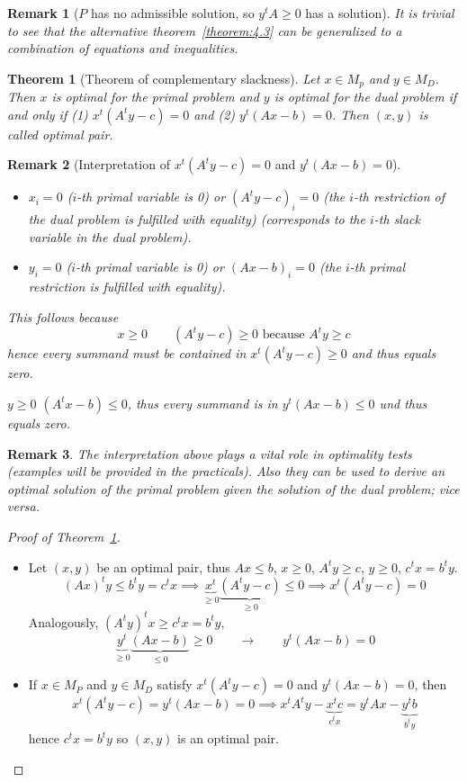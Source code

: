 \documentclass[a4paper]{article}
\newcounter{lecref}[subsection]
\numberwithin{lecref}{subsection}
\newtheorem{theorem}[lecref]{Theorem}
\newtheorem*{Remark}{Remark}
\begin{document}
\begin{Remark}[$P$ has no admissible solution, so $y^t A \geq 0$ has a solution]
	It is trivial to see that the alternative theorem~\ref{theorem:4.3} can be generalized to a combination of equations and inequalities.
\end{Remark}

\begin{theorem}[Theorem of complementary slackness]
	\label{theorem:4.7}
	Let $x \in M_p$ and $y \in M_D$. Then $x$ is optimal for the primal problem and $y$ is optimal for the dual problem
	if and only if (1) $x^t (A^t y - c) = 0$ and (2) $y^t (Ax - b) = 0$. Then $(x, y)$ is called \emph{optimal pair}.
\end{theorem}

\begin{Remark}[Interpretation of $x^t (A^t y - c) = 0$ and $y^t (Ax - b) = 0$]
	\begin{itemize}
		\item $x_i = 0$ ($i$-th primal variable is 0) or $(A^t y - c)_i = 0$ (the $i$-th restriction of the dual problem is fulfilled with equality) (corresponds to the $i$-th slack variable in the dual problem).
		\item $y_i = 0$ ($i$-th primal variable is 0) or $(Ax - b)_i = 0$ (the $i$-th primal restriction is fulfilled with equality).
	\end{itemize}
	This follows because
	\[ x \geq 0 \qquad (A^t y - c) \geq 0 \text{ because } A^t y \geq c \]
	hence every summand must be contained in $x^t (A^ty - c) \geq 0$ and thus equals zero.

	$y \geq 0$ $(A^t x - b) \leq 0$, thus every summand is in $y^t (Ax - b) \leq 0$ und thus equals zero.
\end{Remark}

\begin{Remark}
	The interpretation above plays a vital role in optimality tests (examples will be provided in the practicals).
	Also they can be used to derive an optimal solution of the primal problem given the solution of the dual problem; vice versa.
\end{Remark}

\begin{proof}[Proof of Theorem~\ref{theorem:4.7}]
	\begin{itemize}
		\item 
			Let $(x, y)$ be an optimal pair, thus $Ax \leq b$, $x \geq 0$, $A^t y \geq c$, $y \geq 0$, $c^t x = b^t y$.
			\[ (Ax)^t y \leq b^t y = c^t x \implies \underbrace{x^t}_{\geq 0} \underbrace{(A^ty - c)}_{\geq 0} \leq 0 \implies x^t (A^t y - c) = 0 \]
			Analogously, $(A^t y)^t x \geq c^t x = b^t y$,
			\[ \underbrace{y^t}_{\geq 0} \underbrace{(Ax - b)}_{\leq 0} \geq 0 \qquad \to \qquad y^t (Ax - b) = 0 \]
		\item
			If $x \in M_P$ and $y \in M_D$ satisfy $x^t (A^t y - c) = 0$ and $y^t (Ax - b) = 0$,
			then
			\[ x^t (A^t y - c) = y^t (Ax - b) = 0 \implies x^t A^t y - \underbrace{x^t c}_{c^t x} = y^t Ax - \underbrace{y^t b}_{b^t y} \]
			hence $c^t x = b^t y$ so $(x, y)$ is an optimal pair.
	\end{itemize}
\end{proof}
\end{document}
